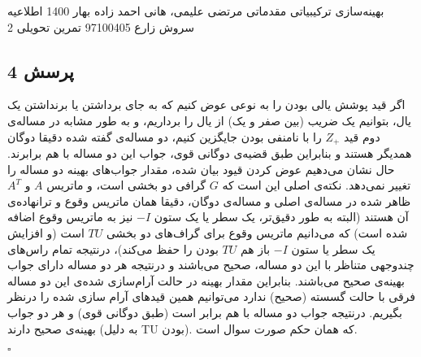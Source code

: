 \documentclass[a4paper,12pt]{article}
\newcounter{problemcounter}
\newcounter{subproblemcounter}
\newcommand{\problem}[1]
{
	\subsection*{
		پرسش
		#1
	}
}
\begin{document}
\handout
{بهینه‌سازی ترکیبیاتی مقدماتی}
{مرتضی علیمی، هانی احمد زاده}
{بهار 1400}
{اطلاعیه}
{سروش زارع}
{97100405}
 {تمرین تحویلی 2}
\problem{4}
اگر قید پوشش یالی بودن را به نوعی عوض کنیم که به جای برداشتن یا برنداشتن یک یال، بتوانیم یک ضریب (بین صفر و یک) از یال را برداریم، و به طور مشابه در مساله‌ی دوم قید $Z_+$ را با نامنفی بودن جایگزین کنیم، دو مساله‌ی گفته شده دقیقا دوگان همدیگر هستند و بنابراین طبق قضیه‌ی دوگانی قوی، جواب این دو مساله با هم برابرند. حال نشان می‌دهیم عوض کردن قیود بیان شده، مقدار جواب‌های بهینه دو مساله را تغییر نمی‌دهد.
نکته‌ی اصلی این است که $G$ گرافی دو بخشی است، و ماتریس $A$ و $A^T$ ظاهر شده در مساله‌ی اصلی و مساله‌ی دوگان، دقیقا همان ماتریس وقوع و ترانهاده‌ی آن هستند (البته به طور دقیق‌تر، یک سطر یا یک ستون $-I$ نیز به ماتریس وقوع اضافه شده است) که می‌دانیم ماتریس وقوع برای گراف‌های دو بخشی $TU$ است (و افزایش یک سطر یا ستون $-I$ باز هم $TU$ بودن را حفظ می‌کند)، درنتیجه تمام راس‌های  چندوجهی متناظر با این دو مساله، صحیح می‌باشند و درنتیجه هر دو مساله دارای جواب بهینه‌ی صحیح می‌باشند. بنابراین مقدار بهینه در حالت آرام‌سازی‌ شده‌ی این دو مساله فرقی با حالت گسسته (صحیح) ندارد می‌توانیم همین قید‌های آرام سازی شده را درنظر بگیریم. درنتیجه جواب دو مساله با هم برابر است (طبق دوگانی قوی) و هر دو جواب بهینه‌ی صحیح دارند (به دلیل TU بودن). که همان حکم صورت سوال است.
\begin{latin}
	$\square$
\end{latin}
\end{document}
